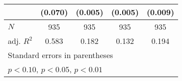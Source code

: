 {\begin{tabular}{l*{4}{c}}
            &     (0.070)         &     (0.005)         &     (0.005)         &     (0.009)         \\
\hline
\(N\)       &         935         &         935         &         935         &         935         \\
adj. \(R^{2}\)&       0.583         &       0.182         &       0.132         &       0.194         \\
\hline\hline
\multicolumn{5}{l}{\footnotesize Standard errors in parentheses}\\
\multicolumn{5}{l}{\footnotesize \sym{*} \(p<0.10\), \sym{**} \(p<0.05\), \sym{***} \(p<0.01\)}\\
\end{tabular}
}

